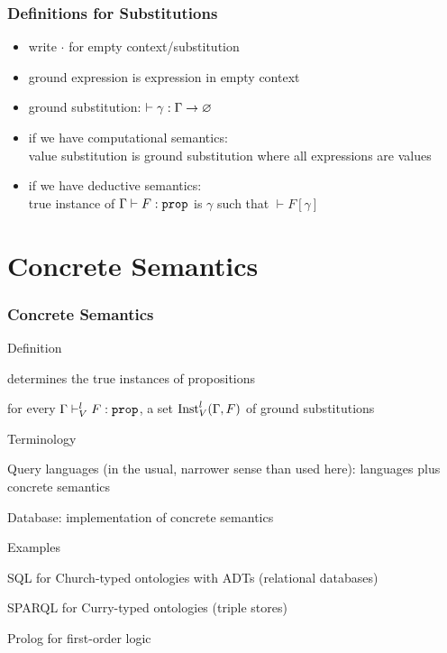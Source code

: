 \begin{frame}\frametitle{Definitions for Substitutions}
\begin{itemize}
\item write $\cdot$ for empty context/substitution
\item ground expression is expression in empty context
\item ground substitution: $\vdash \gamma:\Gamma\to \varnothing$
\item if we have computational semantics: \\ value substitution is ground substitution where all expressions are values
\item if we have deductive semantics: \\
 true instance of $\Gamma\vdash F:\prop$ is $\gamma$ such that $\vdash F[\gamma]$
\end{itemize}
\end{frame}

\section{Concrete Semantics}

\begin{frame}\frametitle{Concrete Semantics}
\begin{blockitems}{Definition}
\item determines the true instances of propositions
\item for every $\Gamma\vdash^l_V F:\prop$, a set $\mathrm{Inst}^l_V(\Gamma,F)$ of ground substitutions
\end{blockitems}

\begin{blockitems}{Terminology}
\item Query languages (in the usual, narrower sense than used here): languages plus concrete semantics
\item Database: implementation of concrete semantics
\end{blockitems}

\begin{blockitems}{Examples}
\item SQL for Church-typed ontologies with ADTs (relational databases)
\item SPARQL for Curry-typed ontologies (triple stores)
\item Prolog for first-order logic
\end{blockitems}
\end{frame}

